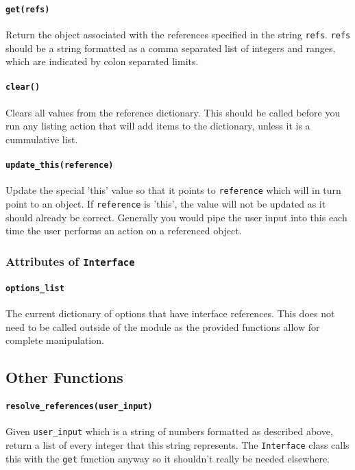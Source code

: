 \documentclass[a4paper]{article}
\begin{document}
\paragraph{\texttt{get(refs)}}
Return the object associated with the references specified in the string 
\texttt{refs}. \texttt{refs} should be a string formatted as a comma separated 
list of integers and ranges, which are indicated by colon separated limits.

\paragraph{\texttt{clear()}}
Clears all values from the reference dictionary. This should be called before 
you run any listing action that will add items to the dictionary, unless it is 
a cummulative list.

\paragraph{\texttt{update\_this(reference)}}
Update the special 'this' value so that it points to \texttt{reference} which 
will in turn point to an object. If \texttt{reference} is 'this', the value 
will not be updated as it should already be correct. Generally you would pipe 
the user input into this each time the user performs an action on a referenced 
object.

\subsubsection{Attributes of \texttt{Interface}}

\paragraph{\texttt{options\_list}}
The current dictionary of options that have interface references. This does 
not need to be called outside of the module as the provided functions allow 
for complete manipulation.

\subsection{Other Functions}

\paragraph{\texttt{resolve\_references(user\_input)}}
Given \texttt{user\_input} which is a string of numbers formatted as described 
above, return a list of every integer that this string represents. The 
\texttt{Interface} class calls this with the \texttt{get} function anyway so 
it shouldn't really be needed elsewhere.
\end{document}
